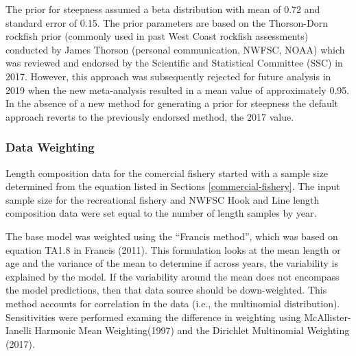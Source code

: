 \documentclass[11pt,
  english,
  a4paper,
]{article}
\begin{document}
\leavevmode\tagmcend\tagstructend\par


The prior for steepness assumed a beta distribution with mean of 0.72 and standard error of 0.15. The prior parameters are based on the Thorson-Dorn rockfish prior (commonly used in past West Coast rockfish assessments) conducted by James Thorson (personal communication, NWFSC, NOAA) which was reviewed and endorsed by the Scientific and Statistical Committee (SSC) in 2017. However, this approach was subsequently rejected for future analysis in 2019 when the new meta-analysis resulted in a mean value of approximately 0.95. In the absence of a new method for generating a prior for steepness the default approach reverts to the previously endorsed method, the 2017 value.

\leavevmode\tagmcend\tagstructend\par


\hypertarget{data-weighting}{%
\subsubsection{Data Weighting}\label{data-weighting}}

\leavevmode\tagmcend\tagstructend


Length composition data for the comercial fishery started with a sample size determined from the equation listed in Sections \ref{commercial-fishery}. The input sample size for the recreational fishery and NWFSC Hook and Line length composition data were set equal to the number of length samples by year.

\leavevmode\tagmcend\tagstructend\par


The base model was weighted using the ``Francis method'', which was based on equation TA1.8 in Francis {(2011)\leavevmode\tagmcend\tagstructend}. This formulation looks at the mean length or age and the variance of the mean to determine if across years, the variability is explained by the model. If the variability around the mean does not encompass the model predictions, then that data source should be down-weighted. This method accounts for correlation in the data (i.e., the multinomial distribution). Sensitivities were performed examing the difference in weighting using McAllister-Ianelli Harmonic Mean Weighting{(1997)\leavevmode\tagmcend\tagstructend} and the Dirichlet Multinomial Weighting {(2017)\leavevmode\tagmcend\tagstructend}.
\end{document}
